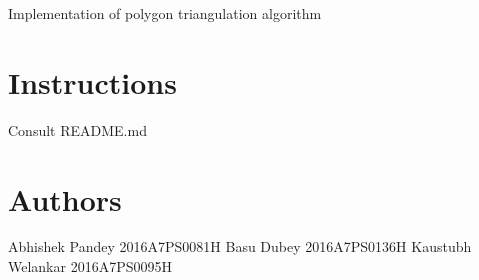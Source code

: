 Implementation of polygon triangulation algorithm \hypertarget{index_Instructions}{}\section{Instructions}\label{index_Instructions}
Consult R\+E\+A\+D\+M\+E.\+md \hypertarget{index_Authors}{}\section{Authors}\label{index_Authors}
\begin{DoxyVerb}Abhishek Pandey       2016A7PS0081H
Basu Dubey            2016A7PS0136H
Kaustubh Welankar     2016A7PS0095H
\end{DoxyVerb}
 